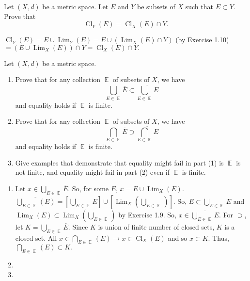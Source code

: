\documentclass[12pt,letterpaper,boxed]{hmcpset}
\DeclareMathOperator{\Lim}{Lim}
\DeclareMathOperator{\Cl}{Cl}
\DeclareMathOperator{\bigep}{\mathbb{E}}
\begin{document}

\begin{problem}[Exercise 1.25]
Let $(X, d)$ be a metric space. Let $E$ and $Y$ be subsets of $X$ such that $E\subset Y.$ Prove that $$\Cl_Y(E)=\Cl_X(E)\cap Y.$$
\end{problem}

\begin{solution}
$\Cl_Y(E)= E \cup \Lim_Y(E)= E \cup (\Lim_X(E)\cap Y)$ (by Exercise 1.10) $ = (E \cup \Lim_X(E))\cap Y = \Cl_X(E)\cap Y.$
\end{solution}

\begin{problem}[Exercise 1.26]
Let $(X, d)$ be a metric space.
	\vspace{-2mm}
	\begin{enumerate}
		\itemsep0em
		\item Prove that for any collection $\bigep$ of subsets of $X$, we have $$ \bigcup_{E\in\bigep} \overline{E} \subset \overline{\bigcup_{E\in\bigep} E}$$ and equality holds if $\bigep$ is finite.
		\item Prove that for any collection $\bigep$ of subsets of $X$, we have $$ \bigcap_{E\in\bigep} \overline{E} \supset \overline{\bigcap_{E\in\bigep} E}$$ and equality holds if $\bigep$ is finite.
		\item Give examples that demonstrate that equality might fail in part (1) is $\bigep$ is not finite, and equality might fail in part (2) even if $\bigep$ is finite.
	\end{enumerate}
\end{problem}

\begin{solution}
\vspace{-2mm}
	\begin{enumerate}
		\itemsep0em
		\item Let $x \in \bigcup_{E \in \bigep} \overline{E}.$ So, for some $E$, $x = E \cup \Lim_X(E).$ $\overline{\bigcup_{E\in\bigep}(E)} = [\bigcup_{E \in \bigep}E]\cup[\Lim_X(\bigcup_{E \in \bigep})].$ So, $E \subset \bigcup_{E \in \bigep}E$ and $\Lim_X (E) \subset \Lim_X(\bigcup_{E \in \bigep})$ by Exercise 1.9. So, $x \in \overline{\bigcup_{E\in\bigep} E}.$ For $\supset$, let $K = \bigcup_{E\in\bigep} \overline{E}.$ Since $K$ is union of finite number of closed sets, $K$ is a closed set. All $x\in \bigcap_{E \in \bigep}(E) \rightarrow x \in \Cl_X(E)$ and so $x \subset K.$ Thus, $\bigcap_{E \in \bigep}(E) \subset K.$ 
		\item 
		\item 
	\end{enumerate}
\end{solution}
\end{document}
